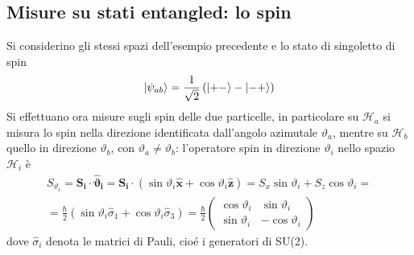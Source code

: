 \subsection{Misure su stati entangled: lo spin}
\label{sec:conti_spin}
Si considerino gli stessi spazi dell'esempio precedente e lo stato di singoletto di spin
$$\ket{\psi_{ab}}=\frac{1}{\sqrt{2}}\left(\ket{+-}-\ket{-+}\right)$$
Si effettuano ora misure sugli spin delle due particelle, in particolare su $\mathcal{H}_a$ si misura
lo spin nella direzione identificata dall'angolo azimutale $\vartheta_a$, mentre su $\mathcal{H}_b$
quello in direzione $\vartheta_b$, con $\vartheta_a\not=\vartheta_b$: l'operatore spin in direzione
$\vartheta_i$ nello spazio $\mathcal{H}_i$ è
\begin{gather*}
S_{\vartheta_i}=\mathbf{S_i}\cdot\mathbf{\hat\vartheta_i}=
\mathbf{S_i}\cdot(\sin\vartheta_i\mathbf{\hat x}+\cos\vartheta_i\mathbf{\hat z})=
S_x\sin\vartheta_i+S_z\cos\vartheta_i=\\=
\frac{\hbar}{2}\left(\sin\vartheta_i\hat\sigma_1+\cos\vartheta_i\hat\sigma_3\right)=
\frac{\hbar}{2}\begin{pmatrix}
    \cos\vartheta_i&\sin\vartheta_i\\
    \sin\vartheta_i&-\cos\vartheta_i
\end{pmatrix}
\end{gather*}
dove $\hat\sigma_i$ denota le matrici di Pauli, cioé i generatori di SU(2).

